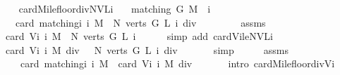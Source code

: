 \begin{isabellebody}
\ \ \isamarkupfalse%
\isanewline
{}\isamarkupfalse%
%
\endisatagproof
{\isafoldproof}%
%
\isadelimproof
\isanewline
%
\endisadelimproof
\isanewline
{}\isamarkupfalse%
\ card{\isacharunderscore}Mi{\isacharunderscore}le{\isacharunderscore}floor{\isacharunderscore}div{\isacharunderscore}{}{\isacharunderscore}NVLi{\isacharcolon}\isanewline
\ \ \ {\isachardoublequoteopen}matching\ G\ M\ {\isasymand}\ i\ {\isachargreater}\ {}{\isachardoublequoteclose}\isanewline
\ \ \ {\isachardoublequoteopen}card\ {\isacharparenleft}matching{\isacharunderscore}i\ i\ M{\isacharparenright}\ {\isasymle}\ {\isacharparenleft}N\ {\isacharparenleft}verts\ G{\isacharparenright}\ L\ i{\isacharparenright}\ div\ {}{\isachardoublequoteclose}\isanewline
%
\isadelimproof
%
\endisadelimproof
%
\isatagproof
{}\isamarkupfalse%
\ {\isacharminus}\ \ \isanewline
\ \ \isamarkupfalse%
\ assms\ \isamarkupfalse%
\ {\isachardoublequoteopen}card\ {\isacharparenleft}V{\isacharunderscore}i\ i\ M{\isacharparenright}\ {\isasymle}\ {\isacharparenleft}N\ {\isacharparenleft}verts\ G{\isacharparenright}\ L\ i{\isacharparenright}{\isachardoublequoteclose}\isanewline
\ \ \ \ \isamarkupfalse%
\ {\isacharparenleft}simp\ add{\isacharcolon}\ card{\isacharunderscore}Vi{\isacharunderscore}le{\isacharunderscore}NVLi{\isacharparenright}\ \isanewline
\ \ \isamarkupfalse%
\ \isamarkupfalse%
\ {\isachardoublequoteopen}card\ {\isacharparenleft}V{\isacharunderscore}i\ i\ M{\isacharparenright}\ div\ {}\ {\isasymle}\ {\isacharparenleft}N\ {\isacharparenleft}verts\ G{\isacharparenright}\ L\ i{\isacharparenright}\ div\ {}{\isachardoublequoteclose}\isanewline
\ \ \ \ \isamarkupfalse%
\ simp\isanewline
\ \ \isamarkupfalse%
\ \isamarkupfalse%
\ assms\ \isamarkupfalse%
\ \isanewline
\ \ \ \ {\isachardoublequoteopen}card\ {\isacharparenleft}matching{\isacharunderscore}i\ i\ M{\isacharparenright}\ {\isasymle}\ card\ {\isacharparenleft}V{\isacharunderscore}i\ i\ M{\isacharparenright}\ div\ {}{\isachardoublequoteclose}\isanewline
\ \ \ \ \isamarkupfalse%
\ {\isacharparenleft}intro\ card{\isacharunderscore}Mi{\isacharunderscore}le{\isacharunderscore}floor{\isacharunderscore}div{\isacharunderscore}{}{\isacharunderscore}Vi{\isacharparenright}\isanewline
\ \ \isamarkupfalse%

\end{isabellebody}
